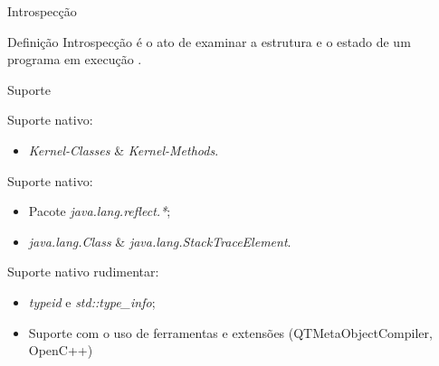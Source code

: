 \documentclass[12pt,t]{beamer}
\begin{document}
 	 \begin{frame}{Introspecção}
 	 	\begin{block}{Definição}
 	 		Introspecção é o ato de examinar a estrutura e o estado de um programa em execução \cite{forman2004java}.\\
 	 	\end{block}
 	 	\begin{block}{Suporte}
 	 		\begin{description}[Smalltalk:]
 	 			\item [Smalltalk:] Suporte nativo:
	 	 			\begin{itemize}
	 	 				\item \emph{Kernel-Classes} \& \emph{Kernel-Methods}.
	 	 			\end{itemize}

 	 			\item [Java:] Suporte nativo: 
 	 			\begin{itemize}
	 	 			\item Pacote \emph{java.lang.reflect.*}; \\ 
	 	 			\item \emph{java.lang.Class} \& \emph{java.lang.StackTraceElement}.
 	 			\end{itemize}

 	 			\item [C++:] Suporte nativo rudimentar: 
	 	 			\begin{itemize}
	 	 				\item \emph{typeid} e \emph{std::type\_info};
	 	 				\item Suporte com o uso de ferramentas e extensões (QTMetaObjectCompiler, OpenC++)
	 	 			\end{itemize}
 			\end{description}
 		\end{block}
 	 \end{frame}
\end{document}
